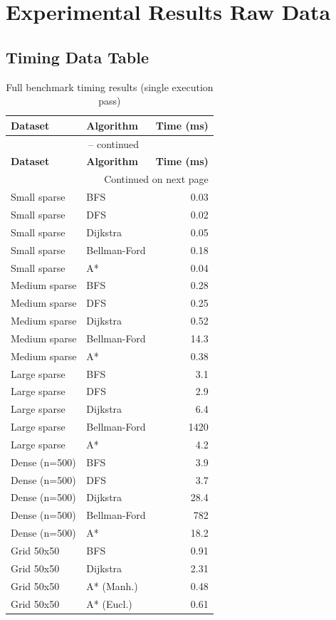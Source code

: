 \documentclass[12pt, a4paper, oneside]{report}
\theoremstyle{definition}
\begin{document}
\chapter{Experimental Results Raw Data}

\section{Timing Data Table}

\begin{longtable}{llr}
\caption{Full benchmark timing results (single execution pass)} \label{tab:full_timing} \\
\toprule
\textbf{Dataset} & \textbf{Algorithm} & \textbf{Time (ms)} \\
\midrule
\endfirsthead
\multicolumn{3}{c}{\tablename\ \thetable{} -- continued} \\
\toprule
\textbf{Dataset} & \textbf{Algorithm} & \textbf{Time (ms)} \\
\midrule
\endhead
\midrule \multicolumn{3}{r}{Continued on next page} \\
\endfoot
\bottomrule
\endlastfoot
Small sparse   & BFS          & 0.03  \\
Small sparse   & DFS          & 0.02  \\
Small sparse   & Dijkstra     & 0.05  \\
Small sparse   & Bellman-Ford & 0.18  \\
Small sparse   & A* & 0.04  \\
Medium sparse  & BFS          & 0.28  \\
Medium sparse  & DFS          & 0.25  \\
Medium sparse  & Dijkstra     & 0.52  \\
Medium sparse  & Bellman-Ford & 14.3  \\
Medium sparse  & A* & 0.38  \\
Large sparse   & BFS          & 3.1   \\
Large sparse   & DFS          & 2.9   \\
Large sparse   & Dijkstra     & 6.4   \\
Large sparse   & Bellman-Ford & 1420  \\
Large sparse   & A* & 4.2   \\
Dense (n=500)  & BFS          & 3.9   \\
Dense (n=500)  & DFS          & 3.7   \\
Dense (n=500)  & Dijkstra     & 28.4  \\
Dense (n=500)  & Bellman-Ford & 782   \\
Dense (n=500)  & A* & 18.2  \\
Grid 50x50     & BFS          & 0.91  \\
Grid 50x50     & Dijkstra     & 2.31  \\
Grid 50x50     & A* (Manh.)   & 0.48  \\
Grid 50x50     & A* (Eucl.)   & 0.61  \\
\end{longtable}
\end{document}
